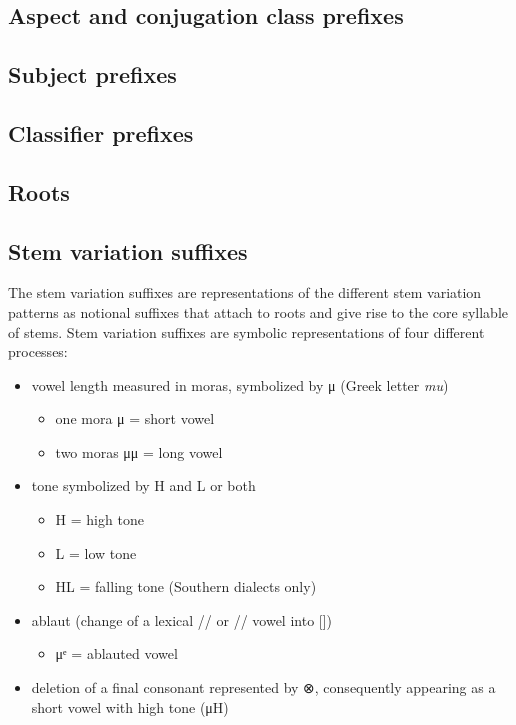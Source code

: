 \subsection{Aspect and conjugation class prefixes}\label{sec:inventory-aspconj}

\subsection{Subject prefixes}\label{sec:inventory-subject}

\subsection{Classifier prefixes}\label{sec:inventory-classifier}

\subsection{Roots}\label{sec:inventory-root}

\subsection{Stem variation suffixes}\label{sec:inventory-stemvar}

The stem variation suffixes are representations of the different stem variation patterns
as notional suffixes that attach to roots and give rise to the core syllable of stems.
Stem variation suffixes are symbolic representations of four different processes:

\begin{itemize}
\item	vowel length measured in moras, symbolized by μ (Greek letter \textit{mu})
	\begin{itemize}
	\item	one mora μ = short vowel
	\item	two moras μμ = long vowel
	\end{itemize}
\item	tone symbolized by H and L or both
	\begin{itemize}
	\item	H = high tone
	\item	L = low tone
	\item	HL = falling tone (Southern dialects only)
	\end{itemize}
\item	ablaut (change of a lexical // or // vowel into [])
	\begin{itemize}
	\item	μᵉ = ablauted vowel
	\end{itemize}
\item	deletion of a final consonant represented by ⊗,
	consequently appearing as a short vowel with high tone (μH)
\end{itemize}

